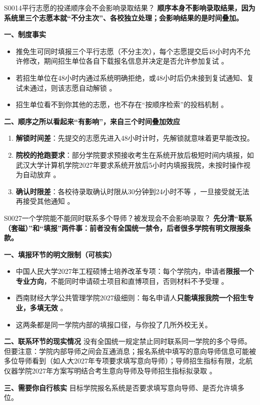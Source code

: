 \begin{qa}{S0014}{平行志愿的投递顺序会不会影响录取结果？}
\textbf{顺序本身不影响录取结果，因为系统里三个志愿本就“不分主次”、各校独立处理；会影响结果的是时间叠加。}

\textbf{一、制度事实}
\begin{itemize}
  \item 推免生可同时填报三个平行志愿（不分主次），每个志愿提交后48小时内不允许修改，期间招生单位各自下载报名信息并决定是否允许参加复试 。
  \item 若招生单位在48小时内通过系统明确拒绝，或48小时后仍未接到复试通知、复试未通过，则该志愿自动解锁 。
  \item 招生单位看不到你其他的志愿，也不存在“按顺序检索”的投档机制 。
\end{itemize}

\textbf{二、顺序之所以看起来“有影响”，来自三个时间叠加效应}
\begin{enumerate}
  \item \textbf{解锁时间差}：先提交的志愿先进入48小时计时，先解锁就意味着更早能改投。
  \item \textbf{院校的抢跑要求}：部分学院要求预接收考生在系统开放后极短时间内填报，如武汉大学计算机学院2027年要求系统开放后5小时内填报我院，未按时操作视为自动放弃 。
  \item \textbf{确认时限差}：各校待录取确认时限从30分钟到24小时不等 ，一旦接受就无法再接受其他通知 。
\end{enumerate}
\end{qa}

\begin{qa}{S0027}{一个学院能不能同时联系多个导师？被发现会不会影响录取？}
\textbf{先分清“联系（套磁）”和“填报”两件事：前者没有全国统一禁令，后者很多学院有明文限报条款。}

\textbf{一、填报环节的明文限制（可核实）}
\begin{itemize}
  \item 中国人民大学2027年工程硕博士培养改革专项：每个学院内，申请者\textbf{限报一个专业方向}，不能同时申请硕士项目和直博项目，否则材料不予受理 。
  \item 西南财经大学公共管理学院2027级细则：每名申请人\textbf{只能填报我院一个招生专业，多填无效} 。
  \item 这两条都是同一学院内部的填报口径，与你投了几所外校无关。
\end{itemize}

\textbf{二、联系环节的现实情况}
没有全国统一规定禁止同时联系同一学院的多个导师。但要注意：学院内部导师之间会互通消息；报名系统中填写的意向导师信息可能被多位导师看到（如人大2027年专项要求填写意向导师）；导师招生指标有限，北航仪器学院2027年方案写明结合考生意向导师及导师招生指标拟录取 。

\textbf{三、需要你自行核实}
目标学院报名系统是否要求填写意向导师、是否允许填多位。
\end{qa}

